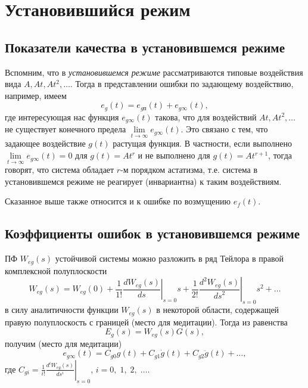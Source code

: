 \documentclass[../../TAU.tex]{subfiles}
\begin{document}

\section{Установившийся режим}

\subsection{Показатели качества в установившемся режиме }

    Вспомним, что в {\it установившемся режиме} рассматриваются типовые воздействия вида $A,At, At^2, \ldots$. Тогда в представлении ошибки по задающему воздействию, например, имеем
    $$
        e_g(t) = e_{gп}(t) + e_{g\infty}(t),
    $$
    где интересующая нас функция $e_{g\infty}(t)$ такова, что для воздействий $At, At^2, \ldots$ не существует конечного предела $\lim\limits_{t\rightarrow\infty} e_{g\infty}(t)$. Это связано с тем, что задающее воздействие $g(t)$ растущая функция. В частности, если выполнено $\lim\limits_{t\rightarrow\infty} e_{g\infty}(t)=0$ для $g(t) = At^r$ и не выполнено для $g(t) = At^{r+1}$, тогда говорят, что система обладает $r$-м порядком астатизма, т.е. система в установившемся режиме не реагирует (инвариантна) к таким воздействиям.

    Сказанное выше также относится и к ошибке по возмущению $e_f(t)$.

\subsection{Коэффициенты ошибок в установившемся режиме}
\label{sec:errors}

    ПФ $W_{eg}(s) $ устойчивой системы можно разложить в ряд Тейлора в правой комплексной полуплоскости
    $$
        W_{eg}(s) = W_{eg}(0) + \frac{1}{1!}\left.\frac{dW_{eg}(s)}{ds}\right|_{s=0}s + \frac{1}{2!}\left.\frac{d^2W_{eg}(s)}{{ds}^2}\right|_{s=0}s^2 + \ldots
    $$
    в силу аналитичности функции $W_{eg}(s)$ в некоторой области, содержащей правую полуплоскость с границей (место для медитации). Тогда из равенства
    $$
        E_g(s) = W_{eg}(s) G(s),
    $$
    получим (место для медитации)
    $$
        e_{g\infty}(t) = C_{g0} g(t) + C_{g1} \dot g(t) + C_{g2} \ddot g(t) + \ldots,
    $$
    где $C_{gi} =\frac{1}{i!}\left.\frac{d^iW_{eg}(s)}{ds^i}\right|_{s=0}$, $i=0,\;1,\;2,\;\ldots$.
\end{document}
